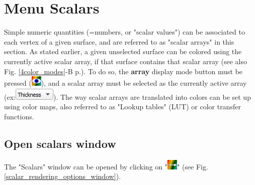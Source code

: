
\chapter{Menu Scalars}\label{scalars_chapter}
\minitoc 

Simple numeric quantities (=numbers, or "scalar values") can be associated to each vertex of a given surface, and are referred to as "scalar arrays" in this section. 
As stated earlier, a given unselected surface can be colored using the currently active scalar array, if that surface contains that scalar array (see also Fig. \ref{4color_modes}-B p.\pageref{4color_modes}). To do so, the \textbf{array} display mode button must be pressed (\includegraphics[scale=0.7]{images/04/show_color_scale.png}), and a scalar array must be selected as the currently active array (ex:\includegraphics[scale=0.5]{images/04/scalarcombo_scalar.png}). The way scalar arrays are translated into colors can be set up using color maps, also referred to as "Lookup tables" (LUT) or color transfer functions. 

\section{Open scalars window}
The "Scalars" window can be opened by clicking on "\includegraphics[scale=0.7]{images/04/color_scale_edit.png}" (see Fig. \ref{scalar_rendering_options_window}).

